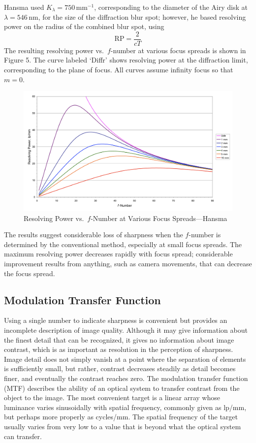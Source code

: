 \documentclass[11pt, oneside]{scrartcl}   	%
\begin{document}
Hansma used $K_λ = 750\,\mathrm{mm}^{-1}$, corresponding to the diameter of the Airy disk at
$λ = 546\,\mathrm{nm}$, for the size of the diffraction blur spot; however, he based resolving power on the radius of the combined blur spot, using
\begin{equation}
\mathrm{RP}= \frac2 {cT}
\end{equation}
The resulting resolving power vs.\ $f$-number at various focus spreads is shown in Figure 5. The curve labeled ‘\textsf{Diffr}’ shows resolving power at the diffraction limit, corresponding to the plane of focus. All curves assume infinity focus so that $m = 0$.
\begin{figure}[htbp] %
   \centering
   \includegraphics[width=\linewidth]{figure/fig_dofd_5} 
   \caption{Resolving Power vs.\ $f$-Number at Various Focus Spreads---Hansma}
   \label{fig:respow}
\end{figure}
The results suggest considerable loss of sharpness when the $f$-number is determined by the conventional method, especially at small focus spreads. The maximum resolving power decreases rapidly with focus spread; considerable improvement results from anything, such as camera movements, that can decrease the focus spread.
\subsection{Modulation Transfer Function}

Using a single number to indicate sharpness is convenient but provides an incomplete description of image quality. Although it may give information about the finest detail that can be recognized, it gives no information about image contrast, which is as important as resolution in the perception of sharpness. Image detail does not simply vanish at a point where the separation of elements is sufficiently small, but rather, contrast decreases steadily as detail becomes finer, and eventually the contrast reaches zero. The modulation transfer function (MTF) describes the ability of an optical system to transfer contrast from the object to the image. The most convenient target is a linear array whose luminance varies sinusoidally with spatial frequency, commonly given as lp/mm, but perhaps more properly as cycles/mm. The spatial frequency of the target usually varies from very low to a value that is beyond what the optical system can transfer.
\end{document}
